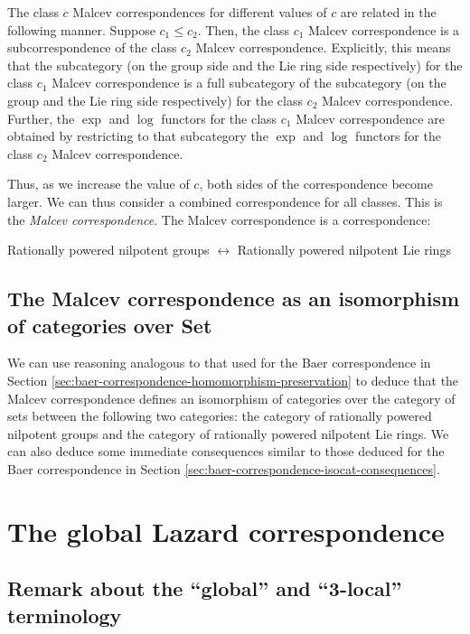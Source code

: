 \documentclass{ucetd}
\begin{document}
The class $c$ Malcev correspondences for different values of $c$ are
related in the following manner. Suppose $c_1 \le c_2$. Then, the
class $c_1$ Malcev correspondence is a subcorrespondence of the class
$c_2$ Malcev correspondence. Explicitly, this means that the
subcategory (on the group side and the Lie ring side respectively) for
the class $c_1$ Malcev correspondence is a full subcategory of the
subcategory (on the group and the Lie ring side respectively) for the
class $c_2$ Malcev correspondence. Further, the $\exp$ and $\log$
functors for the class $c_1$ Malcev correspondence are obtained by
restricting to that subcategory the $\exp$ and $\log$ functors for the
class $c_2$ Malcev correspondence.

Thus, as we increase the value of $c$, both sides of the
correspondence become larger. We can thus consider a combined
correspondence for all classes. This is the {\em Malcev
  correspondence}. The Malcev correspondence is a correspondence:

Rationally powered nilpotent groups $\leftrightarrow$ Rationally
powered nilpotent Lie rings

\subsection{The Malcev correspondence as an isomorphism of categories over Set}

We can use reasoning analogous to that used for the Baer
correspondence in Section
\ref{sec:baer-correspondence-homomorphism-preservation} to deduce that
the Malcev correspondence defines an isomorphism of categories over
the category of sets between the following two categories: the
category of rationally powered nilpotent groups and the category of
rationally powered nilpotent Lie rings. We can also deduce some
immediate consequences similar to those deduced for the Baer
correspondence in Section
\ref{sec:baer-correspondence-isocat-consequences}.

\section{The global Lazard correspondence}\label{sec:global-lazard-correspondence}

\subsection*{Remark about the ``global'' and ``3-local'' terminology}
\end{document}

